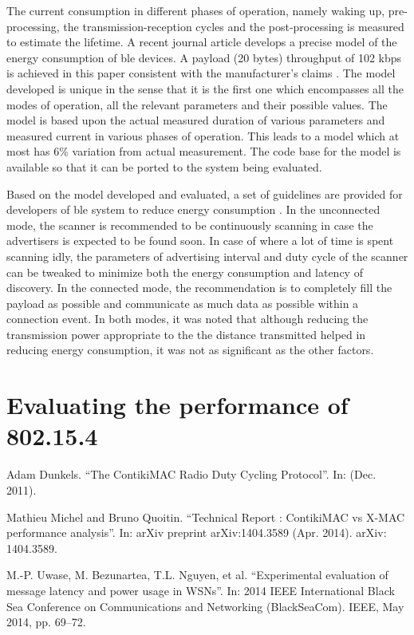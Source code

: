 The current consumption in different phases of operation, namely waking up, pre-processing, the transmission-reception cycles and the post-processing is measured \cite{Mackensen2012} to estimate the lifetime. A recent journal article \cite{Kindt2014} develops a precise model of the energy consumption of \gls{ble} devices. A payload (20 bytes) throughput of 102 kbps is achieved in this paper consistent with the manufacturer's claims \cite{MikkoSavolainen}. The model developed is  unique in the sense that it is the first one which encompasses all the modes of operation, all the relevant parameters and their possible values. The model is based upon the actual measured duration of various parameters and measured current in various phases of operation. This leads to a model which at most has 6\% variation from actual measurement. The code base for the model is available so that it can be ported to the system being evaluated.

Based on the model developed and evaluated, a set of guidelines are provided for developers of \gls{ble} system to reduce energy consumption \cite{Kindt2014}. In the unconnected mode, the scanner is recommended to be continuously scanning in case the advertisers is expected to be found soon. In case of where a lot of time is spent scanning idly, the parameters of advertising interval and duty cycle of the scanner can be tweaked to minimize both the energy consumption and latency of discovery. In the connected mode, the recommendation is to completely fill the payload as possible and communicate as much data as possible within a connection event. In both modes, it was noted that although reducing the transmission power appropriate to the the distance transmitted helped in reducing energy consumption, it was not as significant as the other factors.

\section{Evaluating the performance of 802.15.4}

\cite{Dunkels2011}
Adam Dunkels. “The ContikiMAC Radio Duty Cycling Protocol”. In: (Dec. 2011).

\cite{Michel2014} Mathieu Michel and Bruno Quoitin. “Technical Report : ContikiMAC vs X-MAC performance analysis”. In: arXiv preprint arXiv:1404.3589 (Apr. 2014). arXiv: 1404.3589.

\cite{Uwase2014} M.-P. Uwase, M. Bezunartea, T.L. Nguyen, et al. “Experimental evaluation of message latency and power usage in WSNs”. In: 2014 IEEE International Black Sea Conference on Communications and Networking (BlackSeaCom). IEEE, May 2014,
pp. 69–72.

